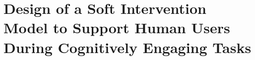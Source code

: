 \documentclass[doctor]{thesis} %
\theoremstyle{plain}
\begin{document}
%





\chapter{Design of a Soft Intervention Model to Support Human Users During Cognitively Engaging Tasks}
\label{chap:soft}
\end{document}
